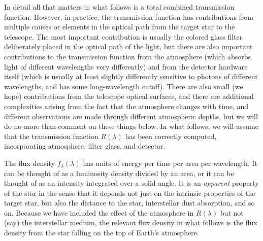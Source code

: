 \documentclass[10pt]{article}
\begin{document}
In detail all that matters in what follows is a total combined transmission function.
However, in practice, the transmission function has contributions from multiple causes or elements in the optical path from the target star to the telescope.
The most important contribution is usually the colored glass filter deliberately placed in the optical path of the light, but there are also important contributions to the transmission function from the atmosphere (which absorbs light of different wavelengths very differently) and from the detector hardware itself (which is usually at least slightly differently sensitive to photons of different wavelengths, and has some long-wavelength cutoff).
There are also small (we hope) contributions from the telescope optical surfaces,
and there are additional complexities arising from the fact that the atmosphere changes with time, and different observations are made through different atmospheric depths, but we will do no more than comment on these things below.
In what follows, we will assume that the transmission function $R(\lambda)$ has been correctly computed, incorporating atmosphere, filter glass, and detector.

The flux density $f_\lambda(\lambda)$ has units of energy per time per area per wavelength.
It can be thought of as a luminosity density divided by an area, or it can be thought of as an intensity integrated over a solid angle.
It is an \emph{apparent} property of the star in the sense that it depends not just on the intrinsic properties of the target star, but also the distance to the star, interstellar dust absorption, and so on.
Because we have included the effect of the atmosphere in $R(\lambda)$ but not (say) the interstellar medium, the relevant flux density in what follows is the flux density from the star falling on the top of Earth's atmosphere.
\end{document}
